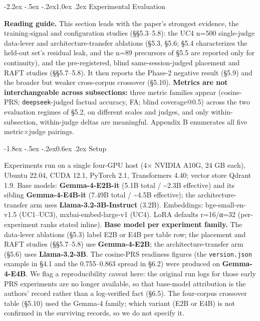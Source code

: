 \documentclass[10pt,twocolumn]{article}
\makeatletter
\renewcommand\section{\@startsection{section}{1}{\z@}%
  {-2.2ex \@plus -.5ex \@minus -.2ex}{1.0ex \@plus .2ex}%
  {\normalfont\large\bfseries}}
\renewcommand\subsection{\@startsection{subsection}{2}{\z@}%
  {-1.8ex \@plus -.5ex \@minus -.2ex}{0.6ex \@plus .2ex}%
  {\normalfont\normalsize\bfseries}}
\makeatother
\begin{document}
\hypertarget{experimental-evaluation}{%
\section{Experimental Evaluation}\label{experimental-evaluation}}

\textbf{Reading guide.} This section leads with the paper's strongest evidence, the training-signal and configuration studies (§§5.3--5.8): the UC4 n=500 single-judge data-lever and architecture-transfer ablations (§5.3, §5.6; §5.4 characterizes the held-out set's residual leak, and the n=89 precursors of §5.5 are reported only for continuity), and the pre-registered, blind same-session-judged placement and RAFT studies (§§5.7--5.8). It then reports the Phase-2 negative result (§5.9) and the broader but weaker cross-corpus crossover (§5.10). \textbf{Metrics are not interchangeable across subsections:} three metric families appear (cosine-PRS; \texttt{deepseek}-judged factual accuracy, FA; blind coverage@0.5) across the two evaluation regimes of §5.2, on different scales and judges, and only within-subsection, within-judge deltas are meaningful. Appendix B enumerates all five metric×judge pairings.

\hypertarget{setup}{%
\subsection{Setup}\label{setup}}

Experiments run on a single four-GPU host (4× NVIDIA A10G, 24 GB each), Ubuntu 22.04, CUDA 12.1, PyTorch 2.1, Transformers 4.40; vector store Qdrant 1.9. Base models: \textbf{Gemma-4-E2B-it} (5.1B total / \textasciitilde2.3B effective) and its sibling \textbf{Gemma-4-E4B-it} (7.49B total / \textasciitilde4.5B effective); the architecture-transfer arm uses \textbf{Llama-3.2-3B-Instruct} (3.2B). Embeddings: bge-small-en-v1.5 (UC1--UC3), mxbai-embed-large-v1 (UC4). LoRA defaults r=16/α=32 (per-experiment ranks stated inline). \textbf{Base model per experiment family.} The data-lever ablations (§5.3) label E2B or E4B per table row; the placement and RAFT studies (§§5.7--5.8) use \textbf{Gemma-4-E2B}; the architecture-transfer arm (§5.6) uses \textbf{Llama-3.2-3B}. The cosine-PRS readiness figures (the \texttt{version.json} example in §4.1 and the 0.755--0.863 spread in §6.2) were produced on \textbf{Gemma-4-E4B}. We flag a reproducibility caveat here: the original run logs for those early PRS experiments are no longer available, so that base-model attribution is the authors' record rather than a log-verified fact (§6.5). The four-corpus crossover table (§5.10) used the Gemma-4 family; which variant (E2B or E4B) is not confirmed in the surviving records, so we do not specify it.
\end{document}
